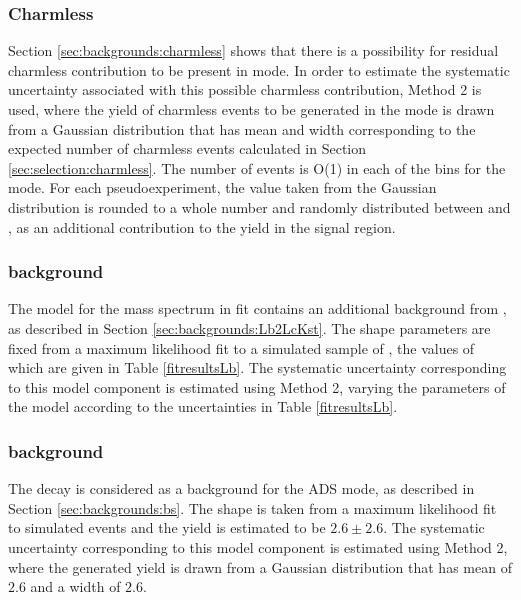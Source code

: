 \subsubsection{Charmless}

Section \ref{sec:backgrounds:charmless} shows that there is a possibility for residual charmless contribution to be present in \pipi mode. In order to estimate the systematic uncertainty associated with this possible charmless contribution, Method 2 is used, where the yield of charmless events to be generated in the \pipi mode is drawn from a Gaussian distribution that has mean and width corresponding to the expected number of charmless events calculated in Section \ref{sec:selection:charmless}. The number of events is O(1) in each of the bins for the \pipi mode. For each pseudoexperiment, the value taken from the Gaussian distribution is rounded to a whole number and randomly distributed between \Bp and \Bm, as an additional contribution to the yield in the signal region. 

\subsubsection{\boldmath {} background}

The model for the \kk mass spectrum in \CP fit contains an additional background from , as described in Section \ref{sec:backgrounds:Lb2LcKst}. The shape parameters are fixed from a maximum likelihood fit to a simulated sample of , the values of which are given in Table \ref{fitresultsLb}. The systematic uncertainty corresponding to this model component is estimated using Method 2, varying the parameters of the model according to the uncertainties in Table \ref{fitresultsLb}.

\subsubsection{\boldmath {} background}

The decay  is considered as a background for the ADS mode, as described in Section \ref{sec:backgrounds:bs}. The shape is taken from a maximum likelihood fit to simulated events and the yield is estimated to be $2.6 \pm 2.6$. The systematic uncertainty corresponding to this model component is estimated using Method 2, where the generated yield is drawn from a Gaussian distribution that has mean of $2.6$ and a width of $2.6$.

